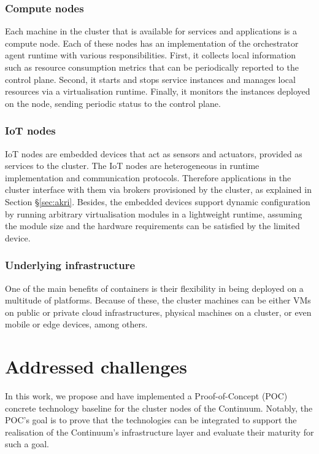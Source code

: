 \subsubsection{Compute nodes}

Each machine in the cluster that is available for services and applications is a compute node. Each of these nodes has an implementation of the orchestrator agent runtime with various responsibilities. First, it collects local information such as resource consumption metrics that can be periodically reported to the control plane. Second, it starts and stops service instances and manages local resources via a virtualisation runtime. Finally, it monitors the instances deployed on the node, sending periodic status to the control plane.

\subsubsection{IoT nodes}

IoT nodes are embedded devices that act as sensors and actuators, provided as services to the cluster. The IoT nodes are heterogeneous in runtime implementation and communication protocols. Therefore applications in the cluster interface with them via brokers provisioned by the cluster, as explained in Section §\ref{sec:akri}. Besides, the embedded devices support dynamic configuration by running arbitrary virtualisation modules in a lightweight runtime, assuming the module size and the hardware requirements can be satisfied by the limited device.

\subsubsection{Underlying infrastructure}

One of the main benefits of containers is their flexibility in being deployed on a multitude of platforms. Because of these, the cluster machines can be either VMs on public or private cloud infrastructures, physical machines on a cluster, or even mobile or edge devices, among others.

\section{Addressed challenges}

In this work, we propose and have implemented a Proof-of-Concept (POC) concrete technology baseline for the cluster nodes of the Continuum. Notably, the POC's goal is to prove that the technologies can be integrated to support the realisation of the Continuum's infrastructure layer and evaluate their maturity for such a goal.

